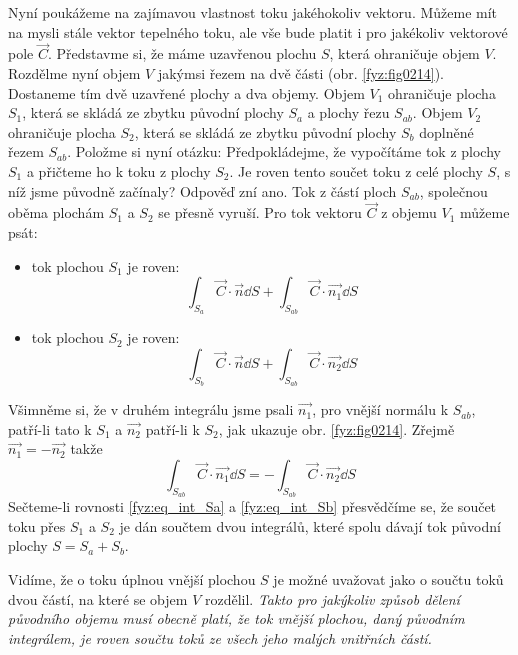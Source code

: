     Nyní poukážeme na zajímavou vlastnost toku jakéhokoliv vektoru. Můžeme mít na mysli stále 
    vektor tepelného toku, ale vše bude platit i pro jakékoliv vektorové pole $\vec{C}$. Představme 
    si, že máme uzavřenou plochu $S$, která ohraničuje objem $V$. Rozdělme nyní objem $V$ jakýmsi 
    řezem na dvě části (obr. \ref{fyz:fig0214}). Dostaneme tím dvě uzavřené plochy a dva objemy. 
    Objem $V_1$ ohraničuje plocha $S_1$, která se skládá ze zbytku původní plochy $S_a$ a plochy 
    řezu $S_{ab}$. Objem $V_2$ ohraničuje plocha $S_2$, která se skládá ze zbytku původní plochy 
    $S_b$ doplněné řezem $S_{ab}$. Položme si nyní otázku: Předpokládejme, že vypočítáme tok z 
    plochy $S_1$ a přičteme ho k toku z plochy $S_2$. Je roven tento součet toku z celé plochy $S$, 
    s níž jsme původně začínaly? Odpověď zní ano. Tok z částí ploch $S_{ab}$, společnou oběma 
    plochám $S_1$ a $S_2$ se přesně vyruší. Pro tok vektoru $\vec{C}$ z objemu $V_1$ můžeme psát:
      
    \begin{itemize}
      \item tok plochou $S_1$ je roven:
        \begin{equation}\label{fyz:eq_int_Sa}
           \int_{S_a}\vec{C}\cdot\vec{n}\dd{S} + \int_{S_{ab}}\vec{C}\cdot\vec{n_1}\dd{S}
        \end{equation}
      \item tok plochou $S_2$ je roven:
         \begin{equation}\label{fyz:eq_int_Sb}
           \int_{S_b}\vec{C}\cdot\vec{n}\dd{S} + \int_{S_{ab}}\vec{C}\cdot\vec{n_2}\dd{S}
        \end{equation}
    \end{itemize} 
    Všimněme si, že v druhém integrálu jsme psali $\vec{n_1}$, pro vnější normálu k $S_{ab}$, 
    patří-li tato k $S_1$ a $\vec{n_2}$ patří-li k $S_2$, jak ukazuje obr. \ref{fyz:fig0214}. 
    Zřejmě $\vec{n_1}= -\vec{n_2}$ takže
    \begin{equation}
    \int_{S_{ab}}\vec{C}\cdot\vec{n_1}\dd{S} = - \int_{S_{ab}}\vec{C}\cdot\vec{n_2}\dd{S}
    \end{equation}
    Sečteme-li rovnosti \ref{fyz:eq_int_Sa} a \ref{fyz:eq_int_Sb} přesvědčíme se, že součet toku 
    přes $S_1$ a $S_2$ je dán součtem dvou integrálů, které spolu dávají tok původní plochy $S = 
    S_a + S_b$.
    
    Vidíme, že o toku úplnou vnější plochou $S$ je možné uvažovat jako o součtu toků dvou částí, na 
    které se objem $V$ rozdělil. \emph{Takto pro jakýkoliv způsob dělení původního objemu musí 
    obecně platí, že tok vnější plochou, daný původním integrálem, je roven součtu toků ze všech 
    jeho malých vnitřních částí.} 
    
